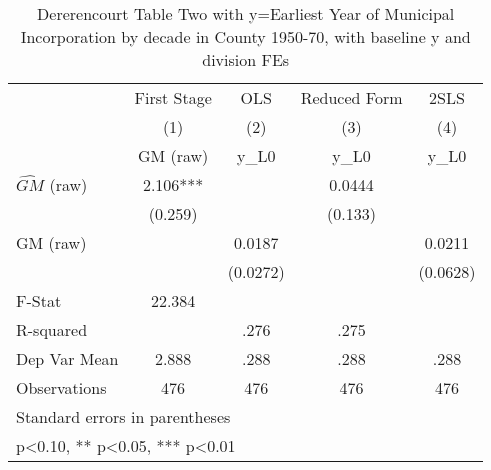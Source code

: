\begin{table}[htbp]\centering
\def\sym#1{\ifmmode^{#1}\else\(^{#1}\)\fi}
\caption{Dererencourt Table Two with y=Earliest Year of Municipal Incorporation by decade in County 1950-70, with baseline y and division FEs}
\begin{tabular}{l*{4}{c}}
\toprule
                    & First Stage   &         OLS   &Reduced Form   &        2SLS   \\
                    &\multicolumn{1}{c}{(1)}&\multicolumn{1}{c}{(2)}&\multicolumn{1}{c}{(3)}&\multicolumn{1}{c}{(4)}\\
                    &\multicolumn{1}{c}{GM  (raw)}&\multicolumn{1}{c}{y\_L0}&\multicolumn{1}{c}{y\_L0}&\multicolumn{1}{c}{y\_L0}\\
\midrule
$\hat{GM}$ (raw)    &       2.106***&               &      0.0444   &               \\
                    &     (0.259)   &               &     (0.133)   &               \\
\addlinespace
GM  (raw)           &               &      0.0187   &               &      0.0211   \\
                    &               &    (0.0272)   &               &    (0.0628)   \\
\midrule
F-Stat              &      22.384   &               &               &               \\
R-squared           &               &        .276   &        .275   &               \\
Dep Var Mean        &       2.888   &        .288   &        .288   &        .288   \\
Observations        &         476   &         476   &         476   &         476   \\
\bottomrule
\multicolumn{5}{l}{\footnotesize Standard errors in parentheses}\\
\multicolumn{5}{l}{\footnotesize * p<0.10, ** p<0.05, *** p<0.01}\\
\end{tabular}
\end{table}
